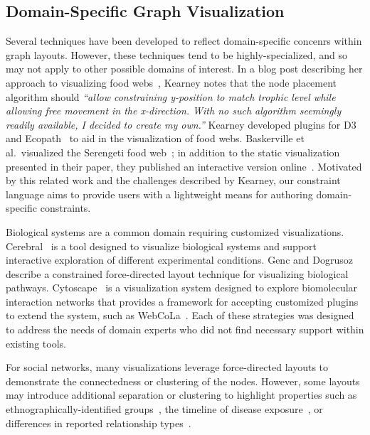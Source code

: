 \subsection{Domain-Specific Graph Visualization}
Several techniques have been developed to reflect
domain-specific concenrs within graph layouts. However, these techniques
tend to be highly-specialized, and so may not apply to other possible
domains of interest. In a blog post describing her approach to
visualizing food webs~\cite{kearney2016blog}, Kearney notes that the node
placement algorithm should \emph{``allow constraining y-position to match
  trophic level while allowing free movement in the x-direction. With no
  such algorithm seemingly readily available, I decided to create my
  own.''} Kearney developed plugins for D3~\cite{kearney2017d3} and
Ecopath~\cite{kearney2017ecopath} to aid in the visualization of
food webs. Baskerville et al.\ visualized the Serengeti food web~\cite{baskerville2011spatial}; in addition to the static visualization
presented in their paper, they published an interactive version online~\cite{baskerville2011interactive}. Motivated by this related work and the
challenges described by Kearney, our constraint language aims to provide users
with a lightweight means for authoring domain-specific constraints.

Biological systems are a common domain requiring customized visualizations.
Cerebral~\cite{barsky2008cerebral} is a tool designed to visualize
biological systems and support interactive exploration of different
experimental conditions. Genc and Dogrusoz~\cite{genc2003constrained}
describe a constrained force-directed layout technique for visualizing 
biological pathways. Cytoscape~\cite{shannon2003cytoscape} is a
visualization system designed to explore biomolecular interaction networks
that provides a framework for accepting customized plugins to extend the
system, such as WebCoLa~\cite{WebCoLa}. Each of these strategies was designed to
address the needs of domain experts who did not find necessary
support within existing tools.

For social networks, many visualizations leverage force-directed layouts
to demonstrate the connectedness or clustering of the nodes. However, some
layouts may introduce additional separation or clustering
to highlight properties such as ethnographically-identified
groups~\cite{rothenberg1998using},
the timeline of disease
exposure~\cite{fitzpatrick2001preventable,mcelroy2003network},
or differences in reported relationship types~\cite{fu2011hiv}.

